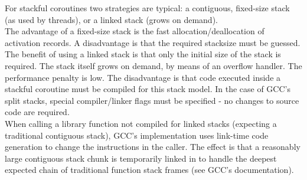 For stackful coroutines two strategies are typical: a contiguous, fixed-size
stack (as used by threads), or a linked stack (grows on demand).\\
The advantage of a fixed-size stack is the fast allocation/deallocation of 
activation records. A disadvantage is that the required stacksize must
be guessed.\\
The benefit of using a linked stack is that only the initial size of the stack
is required. The stack itself grows on demand, by means of an overflow
handler. The performance penalty is low. The disadvantage is that code
executed inside a stackful coroutine must be compiled for this stack model. In
the case of GCC's split stacks, special compiler/linker flags must be
specified - no changes to source code are required.\\
When calling a library function not compiled for linked stacks (expecting a
traditional contiguous stack), GCC's implementation uses link-time code
generation to change the instructions in the caller. The effect is that a
reasonably large contiguous stack chunk is temporarily linked in to handle the
deepest expected chain of traditional function stack frames (see GCC's
documentation\cite{gccsplit}).
